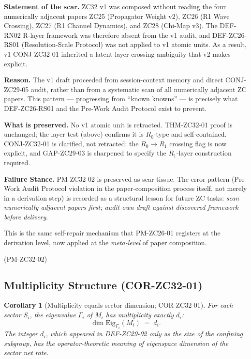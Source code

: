 \documentclass[12pt, a4paper]{article}
\newtheorem{corollary}{Corollary}[section]
\begin{document}
\begin{openqbox}[title={PM-ZC32-02 (NEW v2): R-layer audit
  gap in ZC32 v1 draft}]
\textbf{Statement of the scar.}
ZC32 v1 was composed without reading the four numerically
adjacent papers ZC25 (Propagator Weight v2), ZC26 (R1 Wave
Crossing), ZC27 (R1 Channel Dynamics), and ZC28 (Chi-Map v3).
The DEF-RN02 R-layer framework was therefore absent from
the v1 audit, and DEF-ZC26-RS01 (Resolution-Scale Protocol)
was not applied to v1 atomic units. As a result, v1
CONJ-ZC32-01 inherited a latent layer-crossing ambiguity
that v2 makes explicit.

\textbf{Reason.}
The v1 draft proceeded from session-context memory and
direct CONJ-ZC29-05 audit, rather than from a systematic
scan of all numerically adjacent ZC papers. This pattern
--- progressing from ``known knowns'' --- is precisely
what DEF-ZC26-RS01 and the Pre-Work Audit Protocol exist
to prevent.

\textbf{What is preserved.}
No v1 atomic unit is retracted. THM-ZC32-01 proof is
unchanged; the layer test (above) confirms it is $R_0$-type
and self-contained. CONJ-ZC32-01 is clarified, not retracted:
the $R_0 \to R_1$ crossing flag is now explicit, and
GAP-ZC29-03 is sharpened to specify the $R_1$-layer
construction required.

\textbf{Failure Stance.}
PM-ZC32-02 is preserved as scar tissue. The error pattern
(Pre-Work Audit Protocol violation in the paper-composition
process itself, not merely in a derivation step) is recorded
as a structural lesson for future ZC tasks: \emph{scan
numerically adjacent papers first; audit own draft against
discovered framework before delivery}.

This is the same self-repair mechanism that PM-ZC26-01
registers at the derivation level, now applied at the
\emph{meta-level} of paper composition.

\hfill\textup{(PM-ZC32-02)}
\end{openqbox}

\subsection{Multiplicity Structure (COR-ZC32-01)}
\label{sec:cor-zc32-01}

\begin{corollary}[Multiplicity equals sector dimension;
  COR-ZC32-01]
\label{cor:zc32-01}
For each sector $S_i$, the eigenvalue $\Gamma_i$ of $M_i$
has multiplicity exactly $d_i$:
\[
  \dim \mathrm{Eig}_{\Gamma_i}(M_i) \;=\; d_i.
\]
The integer $d_i$, which appeared in DEF-ZC29-02 only as the
size of the confining subgroup, has the operator-theoretic
meaning of \emph{eigenspace dimension} of the sector net rate.
\end{corollary}
\end{document}
